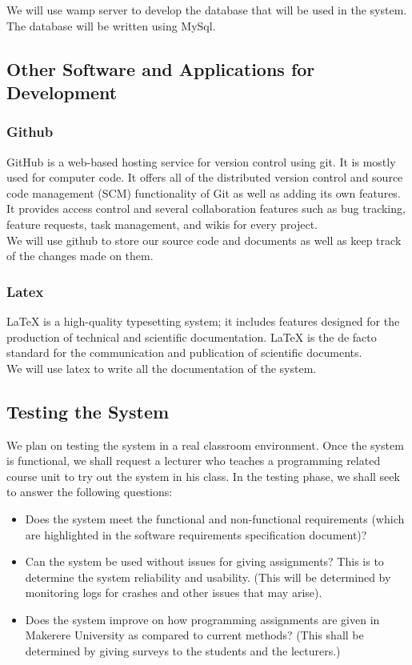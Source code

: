 \documentclass[12pt]{article}
\begin{document}
		\noindent We will use wamp server to develop the database that will be used in the system. The database will be written using MySql.

		
	\subsection{Other Software and Applications for Development}
		\subsubsection{Github}
		GitHub  is a web-based hosting service for version control using git. It is mostly used for computer code. It offers all of the distributed version control and source code management (SCM) functionality of Git as well as adding its own features. It provides access control and several collaboration features such as bug tracking, feature requests, task management, and wikis for every project\cite{git}.\\
		
		\noindent We will use github to store our source code and documents as well as keep track of the changes made on them.
		 
		\subsubsection{Latex}
		LaTeX is a high-quality typesetting system; it includes features designed for the production of technical and scientific documentation. LaTeX is the de facto standard for the communication and publication of scientific documents\cite{latex}.\\
		
		\noindent We will use latex to write all the documentation of the system.
	
	\subsection{Testing the System}
	We plan on testing the system in a real classroom environment. Once the system is functional, we shall request a lecturer who teaches a programming related course unit to try out the system in his class. In the testing phase, we shall seek to answer the following questions:
	\begin{itemize}
		\item Does the system meet the functional and non-functional requirements (which are highlighted in the software requirements specification document)?
		\item Can the system be used without issues for giving assignments? This is to determine the system reliability and usability. (This will be determined by monitoring logs for crashes and other issues that may arise).
		\item Does the system improve on how programming assignments are given in Makerere University as compared to current methods? (This shall be determined by giving surveys to the students and the lecturers.)
	\end{itemize}
	
\end{document}
